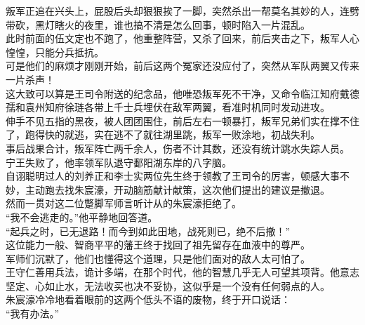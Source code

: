 \begin{multicols}{\theparacolNo}
叛军正追在兴头上，屁股后头却狠狠挨了一脚，突然杀出一帮莫名其妙的人，连劈带砍，黑灯瞎火的夜里，谁也搞不清是怎么回事，顿时陷入一片混乱。\\

此时前面的伍文定也不跑了，他重整阵营，又杀了回来，前后夹击之下，叛军人心惶惶，只能分兵抵抗。\\

可是他们的麻烦才刚刚开始，前后这两个冤家还没应付了，突然从军队两翼又传来一片杀声！\\

这大致可以算是王司令附送的纪念品，他唯恐叛军死不干净，又命令临江知府戴德孺和袁州知府徐琏各带上千士兵埋伏在敌军两翼，看准时机同时发动进攻。\\

伸手不见五指的黑夜，被人团团围住，前后左右一顿暴打，叛军兄弟们实在撑不住了，跑得快的就逃，实在逃不了就往湖里跳，叛军一败涂地，初战失利。\\

事后战果合计，叛军阵亡两千余人，伤者不计其数，还没有统计跳水失踪人员。\\

宁王失败了，他率领军队退守鄱阳湖东岸的八字脑。\\

自诩聪明过人的刘养正和李士实两位先生终于领教了王司令的厉害，顿感大事不妙，主动跑去找朱宸濠，开动脑筋献计献策，这次他们提出的建议是撤退。\\

然而一贯对这二位蹩脚军师言听计从的朱宸濠拒绝了。\\

“我不会逃走的。”他平静地回答道。\\

“起兵之时，已无退路！而今到如此田地，战死则已，绝不后撤！”\\

这位能力一般、智商平平的藩王终于找回了祖先留存在血液中的尊严。\\

军师们沉默了，他们也懂得这个道理，只是他们面对的敌人太可怕了。\\

王守仁善用兵法，诡计多端，在那个时代，他的智慧几乎无人可望其项背。他意志坚定、心如止水，无法收买也决不妥协，这似乎是一个没有任何弱点的人。\\

朱宸濠冷冷地看着眼前的这两个低头不语的废物，终于开口说话：\\

“我有办法。”\\


\end{multicols}
